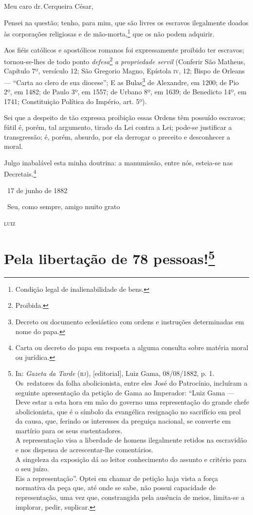 {Meu caro dr.\,Cerqueira César,

Pensei na questão; tenho, para mim, que são livres os escravos
ilegalmente doados às corporações religiosas e de mão-morta,\footnote{
  Condição legal de inalienabilidade de bens.} que os não podem
adquirir.

Aos fiéis católicos e apostólicos romanos foi expressamente proibido ter
escravos; tornou-se-lhes de todo ponto \emph{defesa}\footnote{
  Proibida.} \emph{a propriedade servil} (Conferir São
Matheus, Capítulo 7º, versículo 12; São Gregorio
Magno, Epístola \textsc{iv}, 12; Bispo de Orleans --- ``Carta ao
clero de sua diocese''; E as Bulas\footnote{Decreto ou documento
  eclesiástico com ordens e instruções determinadas em nome do papa.}
de Alexandre, em 1200; de Pio 2º, em 1482; de Paulo
3º, em 1557; de Urbano 8º, em 1639; de Benedicto 14º, em 1741;
Constituição Política do Império, art. 5º).

Sei que a despeito de tão expressa proibição essas Ordens têm possuído
escravos; fútil é, porém, tal argumento, tirado da Lei contra a Lei;
pode-se justificar a transgressão; é, porém, absurdo, por ela derrogar o
preceito e desconhecer a moral.

Julgo inabalável esta minha doutrina: a manumissão, entre nós, esteia-se
nas Decretais.\footnote{Carta ou decreto do papa em resposta a alguma
  consulta sobre matéria moral ou jurídica.}

\hfill\ 17 de junho de 1882

\hfill\ Seu, como sempre, amigo muito grato

\hfill\textsc{luiz}

\chapter{Pela libertação de 78 pessoas!\footnote{In:
  \emph{Gazeta da Tarde} (\textsc{rj}), {[}editorial{]}, Luiz Gama, 08/08/1882,
  p. 1. Os~redatores da folha abolicionista, entre eles José do
  Patrocínio, incluíram a seguinte apresentação da petição de Gama ao
  Imperador: ``Luiz Gama --- Deve estar a esta hora em mão do
  governo uma representação do grande chefe abolicionista, que é o
  símbolo da evangélica resignação no sacrifício em prol da causa, que,
  ferindo os interesses da preguiça nacional, se converte em martírio
  para os seus sustentadores.\\
  A representação visa a liberdade de homens ilegalmente retidos na
  escravidão e nos dispensa de acrescentar-lhe comentários.\\
  A singeleza da exposição dá ao leitor conhecimento do assunto e
  critério para o seu juízo.\\
  Eis a representação''. Optei em chamar de petição haja vista a força
  normativa da peça que, até onde se sabe, não possui capacidade de
  representação, uma vez que, constrangida pela ausência de meios,
  limita-se a implorar, pedir, suplicar.}}


}
